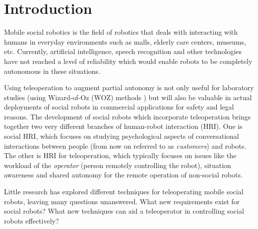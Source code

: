 \documentclass[a4paper, 10pt, conference]{ieeeconf}     %
\begin{document}
\section{Introduction}
% 

Mobile social robotics is the field of robotics that deals with interacting with humans in everyday environments such as malls, elderly care centers, museums, etc.
Currently, artificial intelligence, speech recognition and other technologies have not reached a level of reliability which would enable robots to be completely autonomous in these situations.

Using teleoperation to augment partial autonomy is not only useful for laboratory studies (using Wizard-of-Oz (WOZ) methods \cite{green:applying, steinfeld:theOz, dahlback:wizard}) but will also be valuable in actual deployments of social robots in commercial applications for safety and legal reasons. 
The development of social robots which incorporate teleoperation brings together two very different branches of human-robot interaction (HRI). 
One is social HRI, which focuses on studying psychological aspects of conversational interactions between people (from now on referred to as {\it customers}) and robots.
The other is HRI for teleoperation, which typically focuses on issues like the workload of the {\it operator} (person remotely controlling the robot), situation awareness and shared autonomy for the remote operation of non-social robots.

Little research has explored different techniques for teleoperating mobile social robots, leaving many questions unanswered.
What new requirements exist for social robots? What new techniques can aid a teleoperator in controlling social robots effectively?
\end{document}
